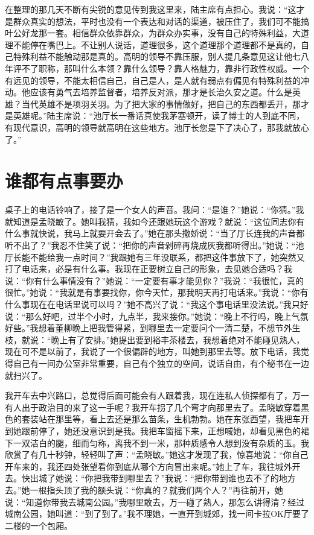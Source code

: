 \documentclass[12pt,oneside]{book}
\begin{document}
在整理的那几天不断有尖锐的意见传到我这里来，陆主席有点担心。我说：``这才是群众真实的想法，平时也没有一个表达和对话的渠道，被压住了，我们可不能搞叶公好龙那一套。相信群众依靠群众，为群众办实事，没有自己的特殊利益，大道理不能停在嘴巴上。不让别人说话，道理很多，这个道理那个道理都不是真的，自己特殊利益不能触动那是真的。高明的领导不靠压服，别人提几条意见这让他七八年评不了职称，那叫什么本领？靠什么领导？靠人格魅力，靠非行政性权威。一个有远见的领导，不能太相信自己，自己是人，是人就有弱点有偏见有特殊利益的冲动。他应该有勇气去培养监督者，培养反对派，那才是长治久安之道。什么是英雄？当代英雄不是项羽关羽。为了把大家的事情做好，把自己的东西都丢开，那才是英雄呢。''陆主席说：``池厅长一番话真使我茅塞顿开，读了博士的人到底不同，有现代意识，高明的领导就高明在这些地方。池厅长您是下了决心了，那我就放心了。''


\chapter{谁都有点事要办}

桌子上的电话铃响了，接了是一个女人的声音。我问：``是谁？''她说：``你猜。''我就知道是孟晓敏了。她叫我猜，我如今还跟她玩这个游戏？就说：``这位同志你有什么事就快说，我马上就要开会去了。''她在那头撒娇说：``当了厅长连我的声音都听不出了？''我忍不住笑了说：``把你的声音剁碎再烧成灰我都听得出。''她说：``池厅长能不能给我一点时间？''我跟她有三年没联系，都把这件事放下了，她突然又打了电话来，必是有什么事。我现在正要树立自己的形象，去见她合适吗？我说：``你有什么事情没有？''她说：``一定要有事才能见你？''我说：``我很忙，真的很忙。''她说：``我就是有事要找你，你今天忙，那我明天再打电话来。''我说：``你有什么事现在在电话里说可以吗？''她不高兴了说：``我这个事电话里没法说。''我只好说：``那么好吧，过半个小时，九点半，我来接你。''她说：``晚上不行吗，晚上气氛好些。''我想着董柳晚上把我管得紧，到哪里去一定要问个一清二楚，不想节外生枝，就说：``晚上有了安排。''她提出要到裕丰茶楼去，我想着绝对不能碰见熟人，现在可不是以前了，我说了一个很偏辟的地方，叫她到那里去等。放下电话，我觉得自己有一间办公室非常重要，自己有个独立的空间，说话自由，有个秘书在一边就扫兴了。

我开车去中兴路口，总觉得后面可能会有人跟着我，现在连私人侦探都有了，万一有人出于政治目的来了这一手呢？我开车拐了几个弯才向那里去了。孟晓敏穿着黑色的套装站在那里等，看上去还是那么苗条，生机勃勃。她在东张西望，我把车开到她跟前停了，她还没意识到是我。我把车窗摇下来，正想喊她，却看见黑色的裙下一双洁白的腿，细而匀称，离我不到一米，那种质感令人想到没有杂质的玉。我欣赏了有几十秒钟，轻轻叫了声：``孟晓敏。''她这才发现了我，惊喜地说：``你自己开车来的，我还四处张望看你到底从哪个方向冒出来呢。''她上了车，我往城外开去。快出城了她说：``你把我带到哪里去？''我说：``把你带到谁也去不了的地方去。''她一根指头顶了我的额头说：``你真的？就我们两个人？''再往前开，她说：``知道你带我去城南公园。''我哪里敢去，万一碰了熟人，那怎么讲得清？经过城南公园，她叫道：``到了到了。''我不理她，一直开到城郊，找一间卡拉OK厅要了二楼的一个包厢。
\end{document}
